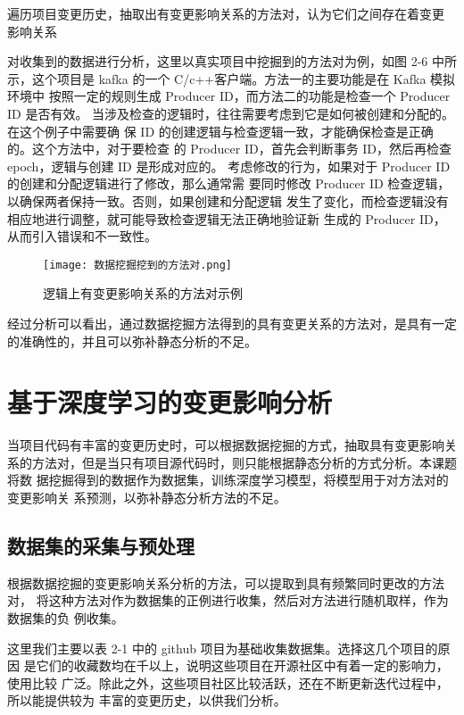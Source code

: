 遍历项目变更历史，抽取出有变更影响关系的方法对，认为它们之间存在着变更
影响关系

对收集到的数据进行分析，这里以真实项目中挖掘到的方法对为例，如图 2-6 中所
示，这个项目是 kafka 的一个 C/c++客户端。方法一的主要功能是在 Kafka 模拟环境中
按照一定的规则生成 Producer ID，而方法二的功能是检查一个 Producer ID 是否有效。
当涉及检查的逻辑时，往往需要考虑到它是如何被创建和分配的。在这个例子中需要确
保 ID 的创建逻辑与检查逻辑一致，才能确保检查是正确的。这个方法中，对于要检查
的 Producer ID，首先会判断事务 ID，然后再检查 epoch，逻辑与创建 ID 是形成对应的。
考虑修改的行为，如果对于 Producer ID 的创建和分配逻辑进行了修改，那么通常需
要同时修改 Producer ID 检查逻辑，以确保两者保持一致。否则，如果创建和分配逻辑
发生了变化，而检查逻辑没有相应地进行调整，就可能导致检查逻辑无法正确地验证新
生成的 Producer ID，从而引入错误和不一致性。

\begin{figure}[h]
\centering
\texttt{[image: 数据挖掘挖到的方法对.png]}
\caption{逻辑上有变更影响关系的方法对示例}
\end{figure}


经过分析可以看出，通过数据挖掘方法得到的具有变更关系的方法对，是具有一定
的准确性的，并且可以弥补静态分析的不足。

\section{基于深度学习的变更影响分析}

当项目代码有丰富的变更历史时，可以根据数据挖掘的方式，抽取具有变更影响关
系的方法对，但是当只有项目源代码时，则只能根据静态分析的方式分析。本课题将数
据挖掘得到的数据作为数据集，训练深度学习模型，将模型用于对方法对的变更影响关
系预测，以弥补静态分析方法的不足。

\subsection{数据集的采集与预处理}

根据数据挖掘的变更影响关系分析的方法，可以提取到具有频繁同时更改的方法对，
将这种方法对作为数据集的正例进行收集，然后对方法进行随机取样，作为数据集的负
例收集。

这里我们主要以表 2-1 中的 github 项目为基础收集数据集。选择这几个项目的原因
是它们的收藏数均在千以上，说明这些项目在开源社区中有着一定的影响力，使用比较
广泛。除此之外，这些项目社区比较活跃，还在不断更新迭代过程中，所以能提供较为
丰富的变更历史，以供我们分析。

